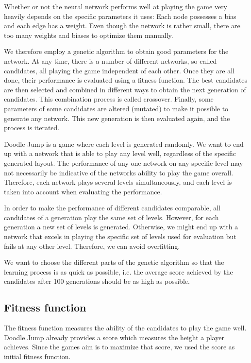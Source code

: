 \documentclass[a4paper,12pt,pagesize,headsepline,bibtotoc,titlepage,abstracton]{scrartcl}
\begin{document}
Whether or not the neural network performs well at playing the game very heavily depends on the specific parameters it uses: Each node possesses a bias and each edge has a weight. Even though the network is rather small, there are too many weights and biases to optimize them manually. 

We therefore employ a genetic algorithm to obtain good parameters for the network. At any time, there is a number of different networks, so-called candidates, all playing the game independent of each other. Once they are all done, their performance is evaluated using a fitness function. The best candidates are then selected and combined in different ways to obtain the next generation of candidates. This combination process is called crossover. Finally, some parameters of some candidates are altered (mutated) to make it possible to generate any network. This new generation is then evaluated again, and the process is iterated.

Doodle Jump is a game where each level is generated randomly. We want to end up with a network that is able to play any level well, regardless of the specific generated layout. The performance of any one network on any specific level may not necessarily be indicative of the networks ability to play the game overall. Therefore, each network plays several levels simultaneously, and each level is taken into account when evaluating the performance.

In order to make the performance of different candidates comparable, all candidates of a generation play the same set of levels. However, for each generation a new set of levels is generated. Otherwise, we might end up with a network that excels in playing the specific set of levels used for evaluation but fails at any other level. Therefore, we can avoid overfitting.

We want to choose the different parts of the genetic algorithm so that the learning process is as quick as possible, i.e. the average score achieved by the candidates after 100 generations should be as high as possible.

\subsection{Fitness function}

The fitness function measures the ability of the candidates to play the game well. Doodle Jump already provides a score which measures the height a player achieves. Since the games aim is to maximize that score, we used the score as initial fitness function.
\end{document}
